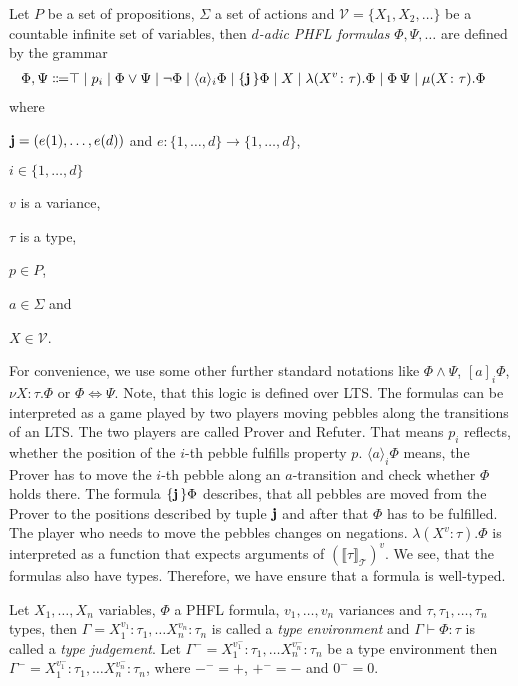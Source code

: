 \begin{definition}
    Let $P$ be a set of propositions, $\Sigma$ a set of actions and $\mathcal{V} = \{X_1, X_2, \dots\}$ be a countable
    infinite
    set of variables, then
    \emph{$d$-adic PHFL formulas} $\Phi, \Psi,\dots$ are defined by the grammar
    \begin{align*}
        \Phi,\Psi\Coloneqq&\top \mid p_i \mid \Phi \vee \Psi \mid \neg \Phi \mid \langle a \rangle_i \Phi \mid
        \{\emph{j}\,\} \Phi \mid X \mid \lambda (X^v\colon\tau).\Phi \mid \Phi\,\Psi\mid  \mu (X\colon\tau).\Phi
    \end{align*}
    where
    \begin{compactitem}
        \item $\emph{j} = (e(1), \dots, e(d))$ and $e: \{1, \dots, d\} \rightarrow \{1, \dots, d\}$,
        \item $i \in \{1, \dots, d\}$
        \item $v$ is a variance,
        \item $\tau$ is a type,
        \item $p \in P$,
        \item $a \in \Sigma$ and
        \item $X \in \mathcal{V}$.
    \end{compactitem}
\end{definition}

For convenience, we use some other further standard notations like $\Phi \wedge \Psi$, $[a]_i\Phi$, $\nu
X \colon \tau.\Phi$ or $\Phi \Leftrightarrow \Psi$. Note, that this logic is defined over LTS. The formulas can be interpreted as a game played by two players moving pebbles along the transitions of an LTS. The two players
are called Prover and Refuter. That means $p_i$ reflects, whether the position of the $i$-th pebble fulfills
property $p$. $\langle a \rangle_i \Phi$ means, the Prover has to move the $i$-th pebble along an $a$-transition and
check whether $\Phi$ holds there. The formula $\{\emph{j}\,\} \Phi$ describes, that all pebbles
are moved from the Prover to the positions described by tuple $\emph{j}$ and after that $\Phi$ has to
be fulfilled. The player who needs to move the pebbles changes on negations. $\lambda (X^v\colon\tau).\Phi$ is
interpreted as a function that expects arguments of $(\llbracket\tau\rrbracket_\mathcal{T})^v$. We see, that the
formulas also have types. Therefore, we have ensure that a formula is well-typed.

\begin{definition}
    Let $X_1, \dots, X_n$ variables, $\Phi$ a PHFL formula, $v_1, \dots, v_n$ variances and $\tau, \tau_1, \dots,
    \tau_n$ types, then $\Gamma = X_1^{v_1}\colon \tau_1, \dots X_n^{v_n} \colon \tau_n$ is
    called a \emph{type environment} and $\Gamma \vdash \Phi\colon\tau$
    is called a \emph{type judgement}. Let $\Gamma^- = X_1^{v_1^-}\colon \tau_1, \dots
    X_n^{v_n^-} \colon \tau_n$ be a type environment then $\Gamma^- = X_1^{v_1^-}\colon \tau_1, \dots
    X_n^{v_n^-} \colon \tau_n$, where $-^- = +$, $+^- = -$ and $0^- = 0$.
\end{definition}

